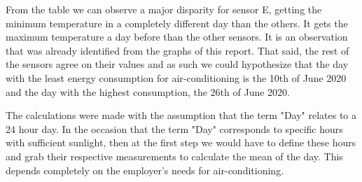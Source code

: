 \documentclass[a4paper,12pt]{article} %
\begin{document}
From the table we can observe a major disparity for sensor E, getting the minimum temperature in a completely different day than the others.
It gets the maximum temperature a day before than the other sensors. It is an observation that was already identified from the graphs of this report. 
That said, the rest of the sensors agree on their values and as such we could hypothesize that the day with the least energy consumption for air-conditioning 
is the 10th of June 2020 and the day with the highest consumption, the 26th of June 2020.


The calculations were made with the assumption that
the term "Day" relates to a 24 hour day. In the occasion that the term "Day" corresponds to specific hours with sufficient sunlight, then at the first step we would have to
define these hours and grab their respective measurements to calculate the mean of the day. This depends completely on the employer's needs for air-conditioning.




\end{document}
